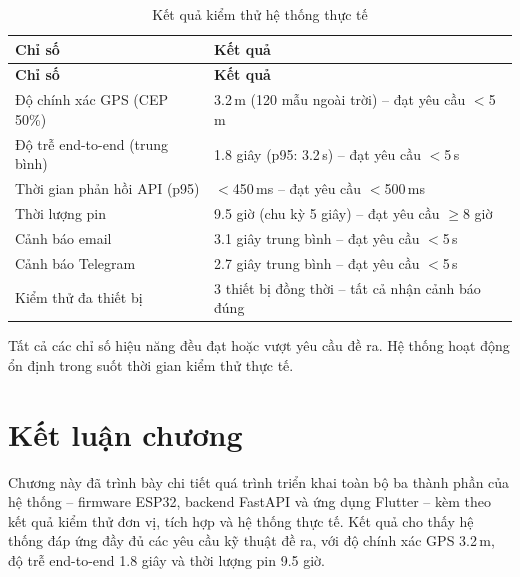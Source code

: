 \documentclass[../DoAn.tex]{subfiles}
\begin{document}
\begin{longtable}{L{4cm}L{9.3cm}}
\caption{Kết quả kiểm thử hệ thống thực tế}\\
\toprule
\textbf{Chỉ số} & \textbf{Kết quả}\\
\midrule
\endfirsthead
\toprule
\textbf{Chỉ số} & \textbf{Kết quả}\\
\midrule
\endhead
Độ chính xác GPS (CEP 50\%) & 3.2\,m (120 mẫu ngoài trời) -- đạt yêu cầu $<$5\,m\\
Độ trễ end-to-end (trung bình) & 1.8 giây (p95: 3.2\,s) -- đạt yêu cầu $<$5\,s\\
Thời gian phản hồi API (p95) & $<$450\,ms -- đạt yêu cầu $<$500\,ms\\
Thời lượng pin & 9.5 giờ (chu kỳ 5 giây) -- đạt yêu cầu $\geq$8 giờ\\
Cảnh báo email & 3.1 giây trung bình -- đạt yêu cầu $<$5\,s\\
Cảnh báo Telegram & 2.7 giây trung bình -- đạt yêu cầu $<$5\,s\\
Kiểm thử đa thiết bị & 3 thiết bị đồng thời -- tất cả nhận cảnh báo đúng\\
\bottomrule
\end{longtable}

Tất cả các chỉ số hiệu năng đều đạt hoặc vượt yêu cầu đề ra. Hệ thống hoạt động ổn định trong suốt thời gian kiểm thử thực tế.

\section{Kết luận chương}

Chương này đã trình bày chi tiết quá trình triển khai toàn bộ ba thành phần của hệ thống -- firmware ESP32, backend FastAPI và ứng dụng Flutter -- kèm theo kết quả kiểm thử đơn vị, tích hợp và hệ thống thực tế. Kết quả cho thấy hệ thống đáp ứng đầy đủ các yêu cầu kỹ thuật đề ra, với độ chính xác GPS 3.2\,m, độ trễ end-to-end 1.8 giây và thời lượng pin 9.5 giờ.
\end{document}
